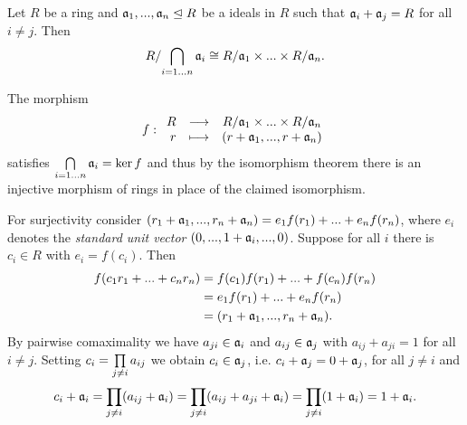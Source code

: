 	\begin{theorem}
		Let $R$ be a ring and $\mathfrak{a}_1, ..., \mathfrak{a}_n \trianglelefteq R$ be a ideals in $R$ such that $\mathfrak{a}_i + \mathfrak{a}_j = R$ for all $i \neq j$. Then
		\begin{equation*}
			R / {\bigcap \limits_{i=1...n} \mathfrak{a}_i} \cong R/\mathfrak{a}_1 \times ... \times R/\mathfrak{a}_n.
		\end{equation*}
	\end{theorem}
	\begin{sketch}
		The morphism
		\begin{equation*}
			f:
			\begin{array}{rrcl}
					R	&\longrightarrow	&R/\mathfrak{a}_1 \times ... \times R/\mathfrak{a}_n\\
					r	&\longmapsto 		&(r+\mathfrak{a}_1, ..., r + \mathfrak{a}_n)
			\end{array}
		\end{equation*}
		satisfies $\bigcap \limits_{i=1...n} \mathfrak{a}_i = \ker f$ and thus by the isomorphism theorem there is an injective morphism of rings in place of the claimed isomorphism.

		For surjectivity consider $(r_1 + \mathfrak{a}_1, ..., r_n + \mathfrak{a}_n) = e_1f(r_1) + ... + e_nf(r_n)$, where $e_i$ denotes the \textit{standard unit vector} $(0,...,1+\mathfrak{a}_i,...,0)$. Suppose for all $i$ there is $c_i \in R$ with $e_i = f(c_i)$. Then
		\begin{align*}
			f(c_1r_1 + ... + c_nr_n) &= f(c_1)f(r_1) + ... + f(c_n)f(r_n)\\
			&=e_1f(r_1) + ... + e_nf(r_n)\\
			&=(r_1 + \mathfrak{a}_1, ..., r_n + \mathfrak{a}_n).
		\end{align*}
		By pairwise comaximality we have $a_{ji} \in \mathfrak{a}_i$ and $a_{ij} \in \mathfrak{a}_j$ with $a_{ij} + a_{ji} = 1$ for all $i\neq j$. Setting $c_i = \prod\limits_{j\neq i}a_{ij}$ we obtain $c_i \in \mathfrak{a}_j$, i.e. $c_i + \mathfrak{a}_j = 0 + \mathfrak{a}_j$, for all $j \neq i$ and 
		\begin{equation*}
			c_i + \ideal{a}_i = \Product \limits_{j\neq i}(a_{ij}+\ideal{a}_i) = \Product \limits_{j \neq i}(a_{ij} + a_{ji} + \ideal{a}_i) = \Product \limits_{j \neq i}(1 + \ideal{a}_i) = 1 + \ideal{a}_i.\vspace{-2.8em}
		\end{equation*}
	\end{sketch}

